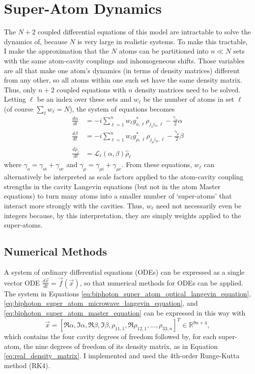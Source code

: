 \section{Super-Atom Dynamics}
The $N+2$ coupled differential equations of this model are intractable to solve the dynamics of, because $N$ is very large in realistic systems. To make this tractable, I make the approximation that the $N$ atoms can be partitioned into $n\ll N$ sets with the same atom-cavity couplings and inhomogeneous shifts. Those variables are all that make one atom's dynamics (in terms of density matrices) different from any other, so all atoms within one such set have the same density matrix. Thus, only $n+2$ coupled equations with $n$ density matrices need to be solved. Letting $\ell$ be an index over these sets and $w_\ell$ be the number of atoms in set $\ell$ (of course $\sum_\ell w_\ell = N$), the system of equations becomes
\begin{align}
    \frac{d\alpha}{dt} &= -i\sum_{\ell=1}^{n} w_\ell g_{o,\ell}^*\rho_{j_oi_o,\ell} - \frac{\gamma_o}{2}\alpha \label{eq:biphoton_super_atom_optical_langevin_equation}\\
    \frac{d\beta}{dt} &= -i\sum_{\ell=1}^{n} w_\ell g_{\mu,\ell}^*\rho_{j_\mu i_\mu,\ell} - \frac{\gamma_\mu}{2}\beta \label{eq:biphoton_super_atom_microwave_langevin_equation}\\
    \frac{d\hat{\rho}_\ell}{dt} &= \mathcal{L}_\ell(\alpha, \beta)\hat{\rho}_\ell \label{eq:biphoton_super_atom_master_equation}
\end{align}
where $\gamma_o = \gamma_{oi}+\gamma_{oc}$ and $\gamma_\mu = \gamma_{\mu i} + \gamma_{\mu c}$. From these equations, $w_\ell$ can alternatively be interpreted as scale factors applied to the atom-cavity coupling strengths in the cavity Langevin equations (but not in the atom Master equations) to turn many atoms into a smaller number of `super-atoms' that interact more strongly with the cavities. Thus, $w_\ell$ need not necessarily even be integers because, by this interpretation, they are simply weights applied to the super-atoms.

\subsection{Numerical Methods}
A system of ordinary differential equations (ODEs) can be expressed as a single vector ODE $\frac{d\vec{x}}{dt} = \vec{f}(\vec{x})$, so that numerical methods for ODEs can be applied. The system in Equations \ref{eq:biphoton_super_atom_optical_langevin_equation}, \ref{eq:biphoton_super_atom_microwave_langevin_equation}, and \ref{eq:biphoton_super_atom_master_equation} can be expressed in this way with
\begin{equation}
    \vec{x} = [\Re\alpha, \Im\alpha, \Re\beta, \Im\beta, \rho_{11,1}, \Re\rho_{12,1}, \dots, \rho_{33,n}]^T \in \mathbb{R}^{9n+4},
\end{equation}
which contains the four cavity degrees of freedom followed by, for each super-atom, the nine degrees of freedom of its density matrix, as in Equation \ref{eq:real_density_matrix}. I implemented and used the 4th-order Runge-Kutta method\cite{faul_book} (RK4).

